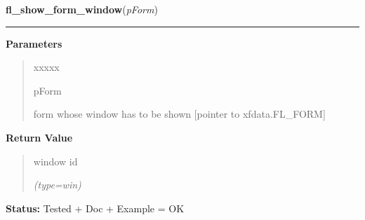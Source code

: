     \label{xformslib:library:fl_show_form_window}

    \vspace{0.5ex}

\hspace{.8\funcindent}\begin{boxedminipage}{\funcwidth}

    \raggedright \textbf{fl\_show\_form\_window}(\textit{pForm})

    \vspace{-1.5ex}

    \rule{\textwidth}{0.5\fboxrule}
\setlength{\parskip}{2ex}
\setlength{\parskip}{1ex}
      \textbf{Parameters}
      \vspace{-1ex}

      \begin{quote}
        \begin{Ventry}{xxxxx}

          \item[pForm]

          form whose window has to be shown [pointer to xfdata.FL\_FORM]

        \end{Ventry}

      \end{quote}

      \textbf{Return Value}
    \vspace{-1ex}

      \begin{quote}
      window id

      {\it (type=win)}

      \end{quote}

\textbf{Status:} Tested + Doc + Example = OK



    \end{boxedminipage}

    \label{xformslib:library:fl_adjust_form_size}

    \vspace{0.5ex}

